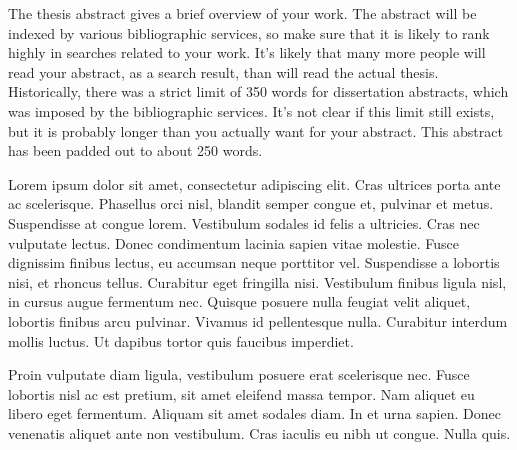 \cleardoublepage
{}

%
\begin{thesisabstract}
The thesis abstract gives a brief overview of your work. The abstract will be indexed by various bibliographic services, so make sure that it is likely to rank highly in searches related to your work. It's likely that many more people will read your abstract, as a search result, than will read the actual thesis. Historically, there was a strict limit of 350 words for dissertation abstracts, which was imposed by the bibliographic services. It's not clear if this limit still exists, but it is probably longer than you actually want for your abstract.  This abstract has been padded out to about 250 words.

Lorem ipsum dolor sit amet, consectetur adipiscing elit. Cras ultrices porta ante ac scelerisque. Phasellus orci nisl, blandit semper congue et, pulvinar et metus. Suspendisse at congue lorem. Vestibulum sodales id felis a ultricies. Cras nec vulputate lectus. Donec condimentum lacinia sapien vitae molestie. Fusce dignissim finibus lectus, eu accumsan neque porttitor vel. Suspendisse a lobortis nisi, et rhoncus tellus. Curabitur eget fringilla nisi. Vestibulum finibus ligula nisl, in cursus augue fermentum nec. Quisque posuere nulla feugiat velit aliquet, lobortis finibus arcu pulvinar. Vivamus id pellentesque nulla. Curabitur interdum mollis luctus. Ut dapibus tortor quis faucibus imperdiet.

Proin vulputate diam ligula, vestibulum posuere erat scelerisque nec. Fusce lobortis nisl ac est pretium, sit amet eleifend massa tempor. Nam aliquet eu libero eget fermentum. Aliquam sit amet sodales diam. In et urna sapien. Donec venenatis aliquet ante non vestibulum. Cras iaculis eu nibh ut congue. Nulla quis. 

\end{thesisabstract}